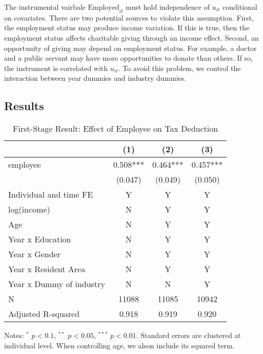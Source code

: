 \documentclass[
  11pt,
  a4paper,
]{article}
\begin{document}
The instrumental vairbale \(\text{Employed}_{it}\) must hold independence of \(u_{it}\) conditional on covariates.
There are two potential sources to violate this assumption.
First, the employment status may produce income variation.
If this is true, then the employment status affects charitable giving through an income effect.
Second, an opportunity of giving may depend on employment status.
For example, a doctor and a public servant may have more opportunities to donate than others.
If so, the instrument is correlated with \(u_{it}\).
To avoid this problem, we control the interaction between year dummies and industry dummies.

\hypertarget{results-1}{%
\subsection{Results}\label{results-1}}

\begin{table}

\caption{\label{tab:stage1Report}First-Stage Result: Effect of Employee on Tax Deduction}
\centering
\fontsize{7}{9}\selectfont
\begin{threeparttable}
\begin{tabular}[t]{lccc}
\toprule
 & (1) & (2) & (3)\\
\midrule
employee & 0.508*** & 0.464*** & 0.457***\\
 & (0.047) & (0.049) & (0.050)\\
Individual and time FE & Y & Y & Y\\
log(income) & N & Y & Y\\
Age & N & Y & Y\\
Year x Education & N & Y & Y\\
Year x Gender & N & Y & Y\\
Year x Resident Area & N & Y & Y\\
Year x Dummy of industry & N & N & Y\\
N & 11088 & 11085 & 10942\\
Adjusted R-squared & 0.918 & 0.919 & 0.920\\
\bottomrule
\end{tabular}
\begin{tablenotes}
\item Notes: $^{*}$ $p < 0.1$, $^{**}$ $p < 0.05$, $^{***}$ $p < 0.01$. Standard errors are clustered at individual level. When controlling age, we alson include its squared term.
\end{tablenotes}
\end{threeparttable}
\end{table}
\end{document}
